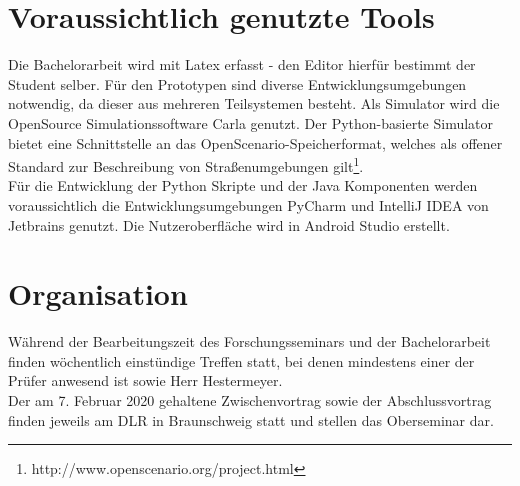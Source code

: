 \documentclass{article}
\begin{document}
\section{Voraussichtlich genutzte Tools}
Die Bachelorarbeit wird mit Latex erfasst - den Editor hierfür bestimmt der Student selber. Für den Prototypen sind diverse Entwicklungsumgebungen notwendig, da dieser aus mehreren Teilsystemen besteht. Als Simulator wird die OpenSource Simulationssoftware \glqq Carla\grqq{} genutzt. Der Python-basierte Simulator bietet eine Schnittstelle an das OpenScenario-Speicherformat, welches als offener Standard zur Beschreibung von Straßenumgebungen gilt\footnote{http://www.openscenario.org/project.html}.\\
Für die Entwicklung der Python Skripte und der Java Komponenten werden voraussichtlich die Entwicklungsumgebungen \glqq PyCharm\grqq{} und \glqq IntelliJ IDEA\grqq{} von Jetbrains genutzt. Die Nutzeroberfläche wird in Android Studio erstellt.

\section{Organisation}
Während der Bearbeitungszeit des Forschungsseminars und der Bachelorarbeit finden wöchentlich einstündige Treffen statt, bei denen mindestens einer der Prüfer anwesend ist sowie Herr Hestermeyer.\\
Der am 7. Februar 2020 gehaltene Zwischenvortrag sowie der Abschlussvortrag finden jeweils am DLR in Braunschweig statt und stellen das Oberseminar dar.
\clearpage
\end{document}
